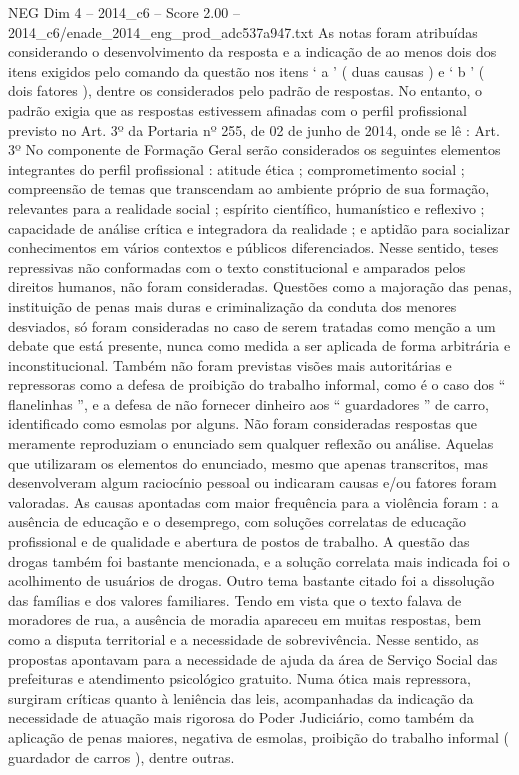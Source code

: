\begin{textsample}{NEG Dim 4 – 2014\_c6 – Score 2.00 – 2014\_c6/enade\_2014\_eng\_prod\_adc537a947.txt}
As notas foram atribuídas considerando o desenvolvimento da resposta e a indicação de ao menos dois dos itens exigidos pelo comando da questão nos itens ‘ a ’ ( duas causas ) e ‘ b ’ ( dois fatores ), dentre os considerados pelo padrão de respostas.
No entanto, o padrão exigia que as respostas estivessem afinadas com o perfil profissional previsto no Art. 3º da Portaria nº 255, de 02 de junho de 2014, onde se lê : Art. 3º No componente de Formação Geral serão considerados os seguintes elementos integrantes do perfil profissional : atitude ética ; comprometimento social ; compreensão de temas que transcendam ao ambiente próprio de sua formação, relevantes para a realidade social ; espírito científico, humanístico e reflexivo ; capacidade de análise crítica e integradora da realidade ; e aptidão para socializar conhecimentos em vários contextos e públicos diferenciados.
Nesse sentido, teses repressivas não conformadas com o texto constitucional e amparados pelos direitos humanos, não foram consideradas.
Questões como a majoração das penas, instituição de penas mais duras e criminalização da conduta dos menores desviados, só foram consideradas no caso de serem tratadas como menção a um debate que está presente, nunca como medida a ser aplicada de forma arbitrária e inconstitucional.
Também não foram previstas visões mais autoritárias e repressoras como a defesa de proibição do trabalho informal, como é o caso dos “ flanelinhas ”, e a defesa de não fornecer dinheiro aos “ guardadores ” de carro, identificado como esmolas por alguns.
Não foram consideradas respostas que meramente reproduziam o enunciado sem qualquer reflexão ou análise.
Aquelas que utilizaram os elementos do enunciado, mesmo que apenas transcritos, mas desenvolveram algum raciocínio pessoal ou indicaram causas e/ou fatores foram valoradas.
As causas apontadas com maior frequência para a violência foram : a ausência de educação e o desemprego, com soluções correlatas de educação profissional e de qualidade e abertura de postos de trabalho.
A questão das drogas também foi bastante mencionada, e a solução correlata mais indicada foi o acolhimento de usuários de drogas.
Outro tema bastante citado foi a dissolução das famílias e dos valores familiares.
Tendo em vista que o texto falava de moradores de rua, a ausência de moradia apareceu em muitas respostas, bem como a disputa territorial e a necessidade de sobrevivência.
Nesse sentido, as propostas apontavam para a necessidade de ajuda da área de Serviço Social das prefeituras e atendimento psicológico gratuito.
Numa ótica mais repressora, surgiram críticas quanto à leniência das leis, acompanhadas da indicação da necessidade de atuação mais rigorosa do Poder Judiciário, como também da aplicação de penas maiores, negativa de esmolas, proibição do trabalho informal ( guardador de carros ), dentre outras.

\end{textsample}
